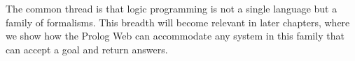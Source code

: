 The common thread is that logic programming is not a single language but a family of formalisms. This breadth will become relevant in later chapters, where we show how the Prolog Web can accommodate any system in this family that can accept a goal and return answers.


%
%
%
%
%
%
